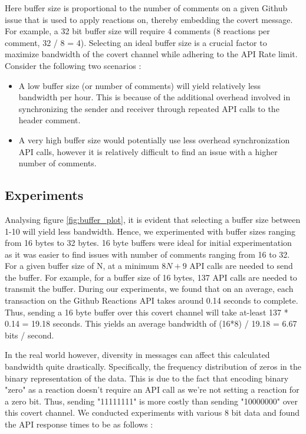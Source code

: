 \documentclass[conference]{IEEEtran}
\begin{document}


Here buffer size is proportional to the number of comments on a given Github issue that is used to apply reactions on, thereby embedding the covert message. For example, a 32 bit buffer size will require 4 comments (8 reactions per comment, 32 / 8 = 4). Selecting an ideal buffer size is a crucial factor to maximize bandwidth of the covert channel while adhering to the API Rate limit. Consider the following two scenarios : 
\begin{itemize}
\item A low buffer size (or number of comments) will yield relatively less bandwidth per hour. This is because of the additional overhead involved in synchronizing the sender and receiver through repeated API calls to the header comment.
\item A very high buffer size would potentially use less overhead synchronization API calls, however it is relatively difficult to find an issue with a higher number of comments.
\end{itemize}

\subsection{Experiments}

Analysing figure \ref{fig:buffer_plot}, it is evident that selecting a buffer size between 1-10 will yield less bandwidth. Hence, we experimented with buffer sizes ranging from 16 bytes to 32 bytes. 16 byte buffers were ideal for initial experimentation as it was easier to find issues with number of comments ranging from 16 to 32. For a given buffer size of N, at a minimum \(8N + 9\) API calls are needed to send the buffer. For example, for a buffer size of 16 bytes, 137 API calls are needed to transmit the buffer. During our experiments, we found that on an average, each transaction on the Github Reactions API takes around 0.14 seconds to complete. Thus, sending a 16 byte buffer over this covert channel will take at-least 137 * 0.14 = 19.18 seconds. This yields an average bandwidth of (16*8) / 19.18 = 6.67 bits / second.

In the real world however, diversity in messages can affect this calculated bandwidth quite drastically. Specifically, the frequency distribution of zeros in the binary representation of the data. This is due to the fact that encoding binary "zero" as a reaction doesn't require an API call as we're not setting a reaction for a zero bit. Thus, sending "11111111" is more costly than sending "10000000" over this covert channel. We conducted experiments with various 8 bit data and found the API response times to be as follows : 
\end{document}
